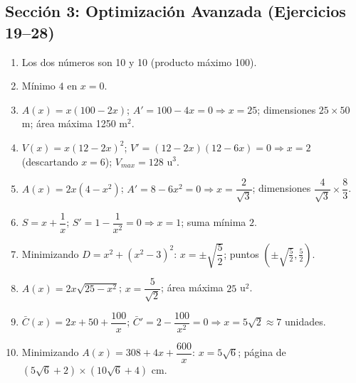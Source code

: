 \documentclass[12pt, letterpaper]{article}
\begin{document}
  \subsection*{Sección 3: Optimización Avanzada (Ejercicios 19--28)}
  \begin{enumerate}[resume=respuestas, leftmargin=*, label=\textbf{\arabic*.}]
    \item Los dos números son 10 y 10 (producto máximo 100).
    \item Mínimo $4$ en $x = 0$.
    \item $A(x) = x(100 - 2x)$; $A' = 100 - 4x = 0 \Rightarrow x = 25$; dimensiones $25 \times 50$ m; área máxima 1250 m$^2$.
    \item $V(x) = x(12 - 2x)^2$; $V' = (12 - 2x)(12 - 6x) = 0 \Rightarrow x = 2$ (descartando $x = 6$); $V_{max} = 128$ u$^3$.
    \item $A(x) = 2x(4 - x^2)$; $A' = 8 - 6x^2 = 0 \Rightarrow x = \dfrac{2}{\sqrt{3}}$; dimensiones $\dfrac{4}{\sqrt{3}} \times \dfrac{8}{3}$.
    \item $S = x + \dfrac{1}{x}$; $S' = 1 - \dfrac{1}{x^2} = 0 \Rightarrow x = 1$; suma mínima $2$.
    \item Minimizando $D = x^2 + (x^2 - 3)^2$: $x = \pm\sqrt{\dfrac{5}{2}}$; puntos $\left(\pm\sqrt{\frac{5}{2}}, \frac{5}{2}\right)$.
    \item $A(x) = 2x\sqrt{25 - x^2}$; $x = \dfrac{5}{\sqrt{2}}$; área máxima $25$ u$^2$.
    \item $\bar{C}(x) = 2x + 50 + \dfrac{100}{x}$; $\bar{C}' = 2 - \dfrac{100}{x^2} = 0 \Rightarrow x = 5\sqrt{2} \approx 7$ unidades.
    \item Minimizando $A(x) = 308 + 4x + \dfrac{600}{x}$: $x = 5\sqrt{6}$; página de $(5\sqrt{6} + 2) \times (10\sqrt{6} + 4)$ cm.
  \end{enumerate}
\end{document}
